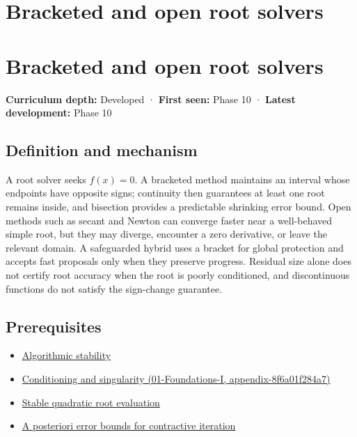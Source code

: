 \hypertarget{appendix-f63eb850796d}{}
\section*{Bracketed and open root solvers}
\section{Bracketed and open root solvers}\label{appendix-f63eb850796d-bracketed-and-open-root-solvers}

\textbf{Curriculum depth:} Developed · \textbf{First seen:} Phase 10 · \textbf{Latest development:} Phase 10

\subsection{Definition and mechanism}\label{appendix-f63eb850796d-definition-and-mechanism}

A root solver seeks \(f(x)=0\). A bracketed method maintains an interval whose endpoints have opposite signs; continuity then guarantees at least one root remains inside, and bisection provides a predictable shrinking error bound. Open methods such as secant and Newton can converge faster near a well-behaved simple root, but they may diverge, encounter a zero derivative, or leave the relevant domain. A safeguarded hybrid uses a bracket for global protection and accepts fast proposals only when they preserve progress. Residual size alone does not certify root accuracy when the root is poorly conditioned, and discontinuous functions do not satisfy the sign-change guarantee.

\subsection{Prerequisites}\label{appendix-f63eb850796d-prerequisites}

\begin{itemize}
\tightlist
\item
  \hyperref[appendix-aa2bf0d79639]{Algorithmic stability}
\item
  \href{../01-Foundations-I/main.pdf\#nameddest=appendix-8f6a01f284a7}{Conditioning and singularity (01-Foundations-I, appendix-8f6a01f284a7)}
\item
  \hyperref[appendix-b9afba7f63e5]{Stable quadratic root evaluation}
\item
  \hyperref[appendix-d83b0ad1be7f]{A posteriori error bounds for contractive iteration}
\end{itemize}

